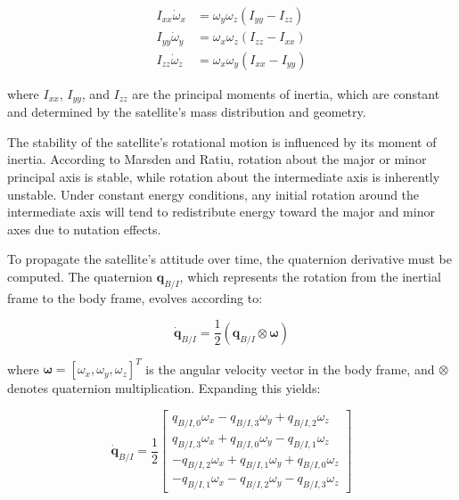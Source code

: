 \begin{align}
I_{xx} \dot{\omega}_x &= \omega_y \omega_z (I_{yy} - I_{zz}) \\
I_{yy} \dot{\omega}_y &= \omega_x \omega_z (I_{zz} - I_{xx}) \\
I_{zz} \dot{\omega}_z &= \omega_x \omega_y (I_{xx} - I_{yy})
\end{align}

\noindent where $I_{xx}$, $I_{yy}$, and $I_{zz}$ are the principal moments of inertia, which are constant and determined by the satellite's mass distribution and geometry.
\vspace{0.5cm}

\noindent The stability of the satellite's rotational motion is influenced by its moment of inertia. According to Marsden and Ratiu, rotation about the 
major or minor principal axis is stable, while rotation about the intermediate axis is inherently unstable. Under constant energy conditions, any 
initial rotation around the intermediate axis will tend to redistribute energy toward the major and minor axes due to nutation effects.
\vspace{0.5cm}

\noindent To propagate the satellite's attitude over time, the quaternion derivative must be computed. The quaternion $\mathbf{q}_{B/I}$, which represents the 
rotation from the inertial frame to the body frame, evolves according to:

\begin{equation}
\dot{\mathbf{q}}_{B/I} = \frac{1}{2}(\mathbf{q}_{B/I} \otimes \boldsymbol{\omega})
\end{equation}

\noindent where $\boldsymbol{\omega} = [\omega_x, \omega_y, \omega_z]^T$ is the angular velocity vector in the body frame, and $\otimes$ denotes 
quaternion multiplication. Expanding this yields:

\begin{equation}
\dot{\mathbf{q}}_{B/I} = \frac{1}{2}
\begin{bmatrix}
q_{B/I,0} \omega_x - q_{B/I,3} \omega_y + q_{B/I,2} \omega_z \\
q_{B/I,3} \omega_x + q_{B/I,0} \omega_y - q_{B/I,1} \omega_z \\
-q_{B/I,2} \omega_x + q_{B/I,1} \omega_y + q_{B/I,0} \omega_z \\
-q_{B/I,1} \omega_x - q_{B/I,2} \omega_y - q_{B/I,3} \omega_z
\end{bmatrix}
\end{equation}

